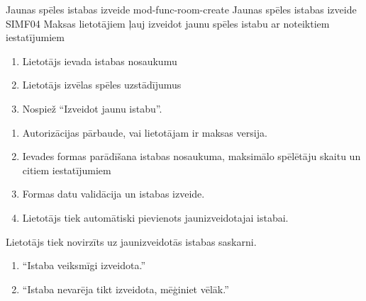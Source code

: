 \moduleFunctionTable
{Jaunas spēles istabas izveide}
{mod-func-room-create}
{Jaunas spēles istabas izveide}
{SIMF04}
{
	Maksas lietotājiem ļauj izveidot jaunu spēles istabu ar noteiktiem iestatījumiem
}
{
	\begin{enumerate}
		\item Lietotājs ievada istabas nosaukumu
		\item Lietotājs izvēlas spēles uzstādījumus
		\item Nospiež ``Izveidot jaunu istabu''.
	\end{enumerate}
}
{
	\begin{enumerate}
		\item Autorizācijas pārbaude, vai lietotājam ir maksas versija.
		\item Ievades formas parādīšana istabas nosaukuma, maksimālo spēlētāju skaitu un citiem iestatījumiem
		\item Formas datu validācija un istabas izveide.
		\item Lietotājs tiek automātiski pievienots jaunizveidotajai istabai.
	\end{enumerate}
}
{
	Lietotājs tiek novirzīts uz jaunizveidotās istabas saskarni.
}
{
	\begin{enumerate}
		\item ``Istaba veiksmīgi izveidota.''
		\item ``Istaba nevarēja tikt izveidota, mēģiniet vēlāk.''
	\end{enumerate}
}
